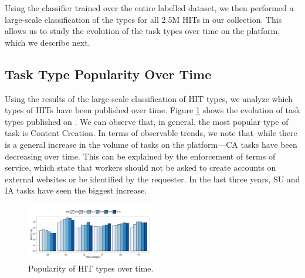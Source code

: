 Using the classifier trained over the entire labelled dataset, we then performed a large-scale classification of the types for all 2.5M HITs in our collection. This allows us to study the evolution of the task types over time on the \amt{} platform, which we describe next.

\subsection{Task Type Popularity Over Time}
Using the results of the large-scale classification of HIT types, we analyze which types of HITs have been published over time.
Figure \ref{fig:cat_trends} shows the evolution of task types published on \amt{}.
% 
We can observe that, in general, the most popular type of task is Content Creation.
% 
In terms of observable trends, we note that--while there is a general increase in the volume of tasks on the platform---CA tasks have been decreasing over time. This can be explained  by the enforcement of \amt{} terms of service, which state that workers should not be asked to create accounts on external websites or be identified by the requester.
% 
In the last three years, SU and IA tasks have seen the biggest increase.

\begin{figure}[tb]
	\centering
		\includegraphics[width=0.5\textwidth]{figures/category_trends}
	\caption{Popularity of HIT types over time.}
	\label{fig:cat_trends}
\end{figure}

